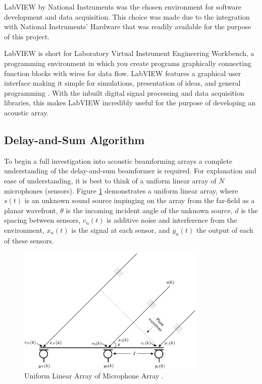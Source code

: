 \documentclass{UoNMCHA}
\numberwithin{equation}{section}
\begin{document}
    LabVIEW by National Instruments was the chosen environment for software development and data acquisition. This choice was made due to the integration with National Instruments' Hardware that was readily available for the purpose of this project. 
    
    LabVIEW is short for Laboratory Virtual Instrument Engineering Workbench, a programming environment in which you create programs graphically connecting function blocks with wires for data flow. LabVIEW features a graphical user interface making it simple for simulations, presentation of ideas, and general programming \citep{Tra06}. With the inbuilt digital signal processing and data acquisition libraries, this makes LabVIEW incredibly useful for the purpose of developing an acoustic array.
\subsection{Delay-and-Sum Algorithm} \label{sec:Software DAS}
    To begin a full investigation into acoustic beamforming arrays a complete understanding of the delay-and-sum beamformer is required. For explanation and ease of understanding, it is best to think of a uniform linear array of $N$ microphones (sensors). Figure \ref{fig:ULA} demonstrates a uniform linear array, where $s(t)$ is an unknown sound source impinging on the array from the far-field as a planar wavefront, $\theta$ is the incoming incident angle of the unknown source, $d$ is the spacing between sensors, $v_n(t)$ is additive noise and interference from the environment, $x_n(t)$ is the signal at each sensor, and $y_n(t)$ the output of each of these sensors.
    
    \begin{figure} [H]
        \centering
        \includegraphics[keepaspectratio, width = 0.8\textwidth]{Figures/ULA.png}
        \caption{Uniform Linear Array of Microphone Array \citep{Ben08}.}
        \label{fig:ULA}
    \end{figure}
    
\end{document}
